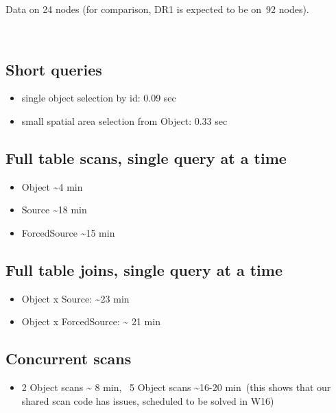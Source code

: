 \documentclass[DM,toc]{lsstdoc}
\begin{document}
Data on 24 nodes (for comparison, DR1 is expected to be on~92 nodes).

~

\subsection{\texorpdfstring{\textbf{Short
queries}}{Short queries}}\label{short-queries}

\begin{itemize}
\item
  single object selection by id: 0.09 sec
\item
  small spatial area selection from Object: 0.33 sec
\end{itemize}

\subsection{\texorpdfstring{\textbf{Full table scans, single query at
a
time}}{Full table scans, single query at a time}}\label{full-table-scans-single-query-at-a-time}

\begin{itemize}
\item
  Object \textasciitilde{}4 min
\item
  Source \textasciitilde{}18 min
\item
  ForcedSource \textasciitilde{}15 min
\end{itemize}

\subsection{\texorpdfstring{\textbf{Full table joins, single query at
a
time}}{Full table joins, single query at a time}}\label{full-table-joins-single-query-at-a-time}

\begin{itemize}
\item
  Object x Source: \textasciitilde{}23 min
\item
  Object x ForcedSource: \textasciitilde{} 21 min
\end{itemize}

\subsection{\texorpdfstring{\textbf{Concurrent
scans}}{Concurrent scans}}\label{concurrent-scans}

\begin{itemize}
\item
  2 Object scans \textasciitilde{} 8 min, ~5 Object scans
  \textasciitilde{}16-20 min~(this shows that our shared scan code has
  issues, scheduled to be solved in W16)
\end{itemize}
\end{document}

